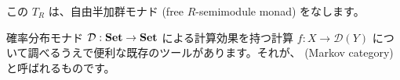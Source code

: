 \documentclass[
		head_space=20mm,
		foot_space=20mm,
		gutter=10mm,
		line_length=190mm
]{jlreq}
\begin{document}
\clearpage

\noindent この $T_R$ は、自由半加群モナド (free $R$-semimodule monad) をなします。

\clearpage

\noindent\begin{large}\end{large}\vspace{5pt}

\noindent 確率分布モナド $\mathcal D:\mathbf{Set}\to\mathbf{Set}$ による計算効果を持つ計算 $f\colon X\to\mathcal D(Y)$ について調べるうえで便利な既存のツールがあります。それが、 (Markov category) と呼ばれるものです。%
\vspace{5pt}
\end{document}
